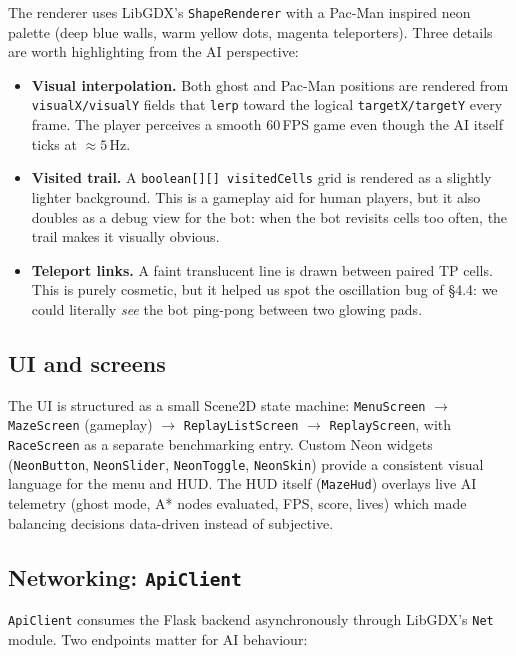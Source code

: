 \documentclass[11pt,a4paper]{article}
\begin{document}
The renderer uses LibGDX's \texttt{ShapeRenderer} with a Pac-Man
inspired neon palette (deep blue walls, warm yellow dots, magenta
teleporters). Three details are worth highlighting from the AI
perspective:

\begin{itemize}[leftmargin=1.3em,itemsep=1pt]
  \item \textbf{Visual interpolation.} Both ghost and Pac-Man positions
        are rendered from \texttt{visualX/visualY} fields that
        \texttt{lerp} toward the logical \texttt{targetX/targetY} every
        frame. The player perceives a smooth 60\,FPS game even though
        the AI itself ticks at $\approx 5$\,Hz.
  \item \textbf{Visited trail.} A \texttt{boolean[][]\,visitedCells}
        grid is rendered as a slightly lighter background. This is a
        gameplay aid for human players, but it also doubles as a debug
        view for the bot: when the bot revisits cells too often, the
        trail makes it visually obvious.
  \item \textbf{Teleport links.} A faint translucent line is drawn
        between paired TP cells. This is purely cosmetic, but it helped
        us spot the oscillation bug of \S4.4: we could literally
        \emph{see} the bot ping-pong between two glowing pads.
\end{itemize}

\subsection{UI and screens}

The UI is structured as a small Scene2D state machine:
\texttt{MenuScreen} $\to$ \texttt{MazeScreen} (gameplay) $\to$
\texttt{ReplayListScreen} $\to$ \texttt{ReplayScreen}, with
\texttt{RaceScreen} as a separate benchmarking entry. Custom Neon
widgets (\texttt{NeonButton}, \texttt{NeonSlider}, \texttt{NeonToggle},
\texttt{NeonSkin}) provide a consistent visual language for the menu
and HUD. The HUD itself (\texttt{MazeHud}) overlays live AI telemetry
(ghost mode, A* nodes evaluated, FPS, score, lives) which made
balancing decisions data-driven instead of subjective.

\subsection{Networking: \texttt{ApiClient}}

\texttt{ApiClient} consumes the Flask backend asynchronously through
LibGDX's \texttt{Net} module. Two endpoints matter for AI behaviour:
\end{document}
